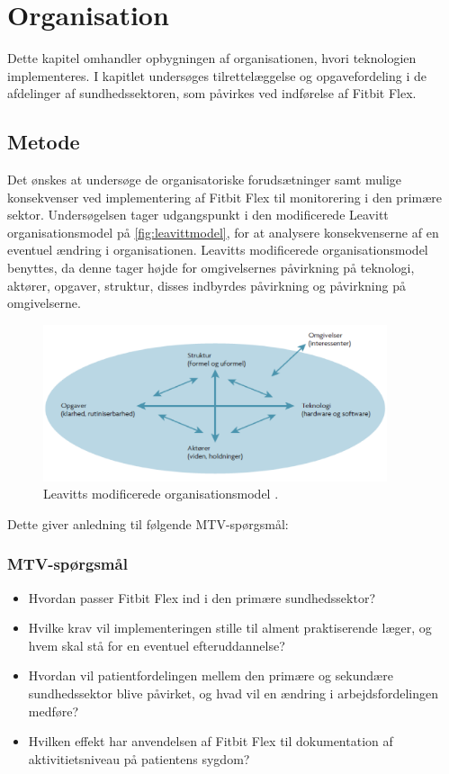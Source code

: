 \chapter{Organisation}
Dette kapitel omhandler opbygningen af organisationen, hvori teknologien implementeres. I kapitlet undersøges tilrettelæggelse og opgavefordeling i de afdelinger af sundhedssektoren, som påvirkes ved indførelse af Fitbit Flex.

\section{Metode}
Det ønskes at undersøge de organisatoriske forudsætninger samt mulige konsekvenser ved implementering af Fitbit Flex til monitorering i den primære sektor. Undersøgelsen tager udgangspunkt i den modificerede Leavitt organisationsmodel på \autoref{fig:leavittmodel}, for at analysere konsekvenserne af en eventuel ændring i organisationen. Leavitts modificerede organisationsmodel benyttes, da denne tager højde for omgivelsernes påvirkning på teknologi, aktører, opgaver, struktur, disses indbyrdes påvirkning og påvirkning på omgivelserne.

\begin{figure}[H]
\centering
\includegraphics[width=0.9\textwidth]{figures/leavitt}
\caption{Leavitts modificerede organisationsmodel \citep{mtvhaandbog}.}
\label{fig:leavittmodel}
\end{figure}
\noindent
Dette giver anledning til følgende MTV-spørgsmål:

\subsection{MTV-spørgsmål}
\begin{itemize}
\item Hvordan passer Fitbit Flex ind i den primære sundhedssektor? 
\item Hvilke krav vil implementeringen stille til alment praktiserende læger, og hvem skal stå for en eventuel efteruddannelse? 
\item  Hvordan vil patientfordelingen mellem den primære og sekundære sundhedssektor blive påvirket, og hvad vil en ændring i arbejdsfordelingen medføre?
\item Hvilken effekt har anvendelsen af Fitbit Flex til dokumentation af aktivitietsniveau på patientens sygdom?
\end{itemize}